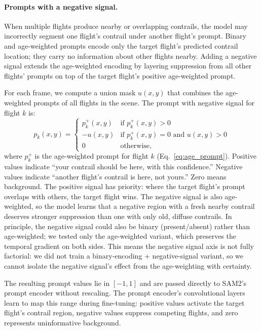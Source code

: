 \documentclass[1p,11pt]{elsarticle}
\begin{document}
\paragraph{Prompts with a negative signal.} When multiple flights produce nearby or overlapping contrails, the model may incorrectly segment one flight's contrail under another flight's prompt. Binary and age-weighted prompts encode only the target flight's predicted contrail location; they carry no information about other flights nearby. Adding a negative signal extends the age-weighted encoding by layering suppression from all other flights' prompts on top of the target flight's positive age-weighted prompt.

For each frame, we compute a union mask $u(x,y)$ that combines the age-weighted prompts of all flights in the scene. The prompt with negative signal for flight $k$ is:
\begin{equation}
    p_k(x, y) = \begin{cases}
        p_k^+(x, y) & \text{if } p_k^+(x, y) > 0 \\
        -u(x, y)    & \text{if } p_k^+(x, y) = 0 \text{ and } u(x,y) > 0 \\
        0            & \text{otherwise,}
    \end{cases}
\label{eq:neg_prompt}
\end{equation}
where $p_k^+$ is the age-weighted prompt for flight $k$ (Eq.~\ref{eq:age_prompt}). Positive values indicate ``your contrail should be here, with this confidence.'' Negative values indicate ``another flight's contrail is here, not yours.'' Zero means background. The positive signal has priority: where the target flight's prompt overlaps with others, the target flight wins. The negative signal is also age-weighted, so the model learns that a negative region with a fresh nearby contrail deserves stronger suppression than one with only old, diffuse contrails. In principle, the negative signal could also be binary (present/absent) rather than age-weighted; we tested only the age-weighted variant, which preserves the temporal gradient on both sides. This means the negative signal axis is not fully factorial: we did not train a binary-encoding + negative-signal variant, so we cannot isolate the negative signal's effect from the age-weighting with certainty.

The resulting prompt values lie in $[-1, 1]$ and are passed directly to SAM2's prompt encoder without rescaling. The prompt encoder's convolutional layers learn to map this range during fine-tuning: positive values activate the target flight's contrail region, negative values suppress competing flights, and zero represents uninformative background.
\end{document}
